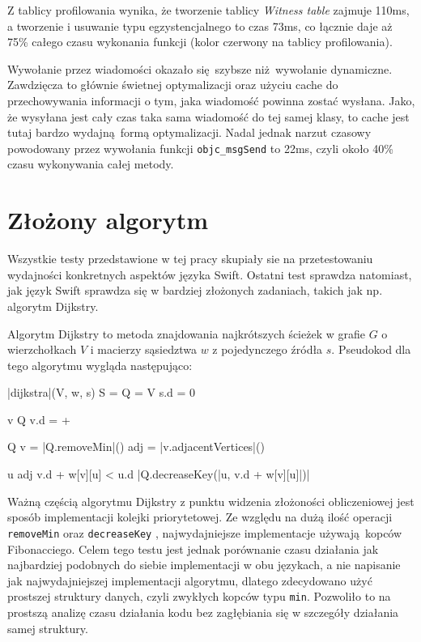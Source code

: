 \documentclass[mgr, shortabstract]{iithesis}
\newcommand{\swiftinline}[1]{
    \texttt{#1}
}
\newcommand{\objcinline}[1]{
    \texttt{#1}
}
\begin{document}
Z tablicy profilowania wynika, że tworzenie tablicy \textit{Witness table} zajmuje 110ms, a tworzenie i usuwanie typu egzystencjalnego to czas 73ms, co łącznie daje aż 75\% całego czasu wykonania funkcji (kolor czerwony na tablicy profilowania).

Wywołanie przez wiadomości okazało się szybsze niż wywołanie dynamiczne. Zawdzięcza to głównie świetnej optymalizacji oraz użyciu cache do przechowywania informacji o tym, jaka wiadomość powinna zostać wysłana. Jako, że wysyłana jest cały czas taka sama wiadomość do tej samej klasy, to cache jest tutaj bardzo wydajną formą optymalizacji. Nadal jednak narzut czasowy powodowany przez wywołania funkcji \objcinline{objc_msgSend} to 22ms, czyli około 40\% czasu wykonywania całej metody.

\section{Złożony algorytm}

Wszystkie testy przedstawione w tej pracy skupiały sie na przetestowaniu wydajności konkretnych aspektów języka Swift. Ostatni test sprawdza natomiast, jak język Swift sprawdza się w bardziej złożonych zadaniach, takich jak np. algorytm Dijkstry.

Algorytm Dijkstry to metoda znajdowania najkrótszych ścieżek w grafie $G$ o wierzchołkach $V$ i macierzy sąsiedztwa $w$ z pojedynczego źródła $s$. Pseudokod dla tego algorytmu wygląda następująco:

\begin{algorithm}
\begin{program}
    \PROC |dijkstra|(V, w, s)
        S = \emptyset {}
        Q = V 
        s.d = 0

        \FOR v \in Q \DO
            v.d = +\infty
        \END

        \WHILE Q \neq \emptyset
            v = |Q.removeMin|()
            adj = |v.adjacentVertices|()

            \FOR u \in adj \DO
                \IF v.d + w[v][u] < u.d
                    \THEN |Q.decreaseKey(|u, v.d + w[v][u]|)|
                \FI
            \END
        \END
\end{program}
\end{algorithm}

Ważną częścią algorytmu Dijkstry z punktu widzenia złożoności obliczeniowej jest sposób implementacji kolejki priorytetowej. Ze względu na dużą ilość operacji \swiftinline{removeMin} oraz \swiftinline{decreaseKey}, najwydajniejsze implementacje używają kopców Fibonacciego. Celem tego testu jest jednak porównanie czasu działania jak najbardziej podobnych do siebie implementacji w obu językach, a nie napisanie jak najwydajniejszej implementacji algorytmu, dlatego zdecydowano użyć prostszej struktury danych, czyli zwykłych kopców typu \texttt{min}. Pozwoliło to na prostszą analizę czasu działania kodu bez zagłębiania się w szczegóły działania samej struktury.
\end{document}
